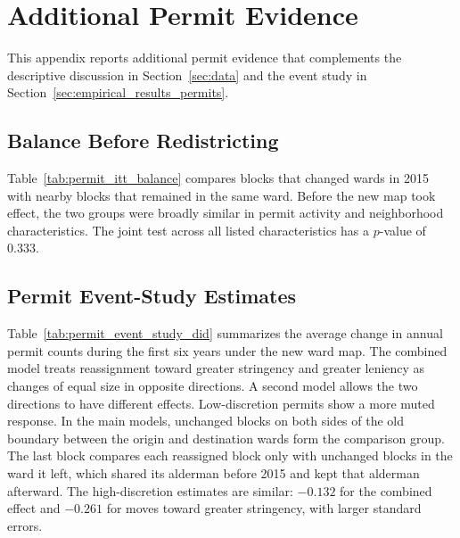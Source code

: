 
\section{Additional Permit Evidence}
\label{sec:appendix_permits}

This appendix reports additional permit evidence that complements the descriptive discussion in Section~\ref{sec:data} and the event study in Section~\ref{sec:empirical_results_permits}.

\subsection{Balance Before Redistricting}
\label{subsec:permit_balance}

Table~\ref{tab:permit_itt_balance} compares blocks that changed wards in 2015 with nearby blocks that remained in the same ward.
Before the new map took effect, the two groups were broadly similar in permit activity and neighborhood characteristics.
The joint test across all listed characteristics has a $p$-value of 0.333.



\subsection{Permit Event-Study Estimates}
\label{subsec:permit_event_study_estimates}

Table~\ref{tab:permit_event_study_did} summarizes the average change in annual permit counts during the first six years under the new ward map.
The combined model treats reassignment toward greater stringency and greater leniency as changes of equal size in opposite directions.
A second model allows the two directions to have different effects.
Low-discretion permits show a more muted response.
In the main models, unchanged blocks on both sides of the old boundary between the origin and destination wards form the comparison group.
The last block compares each reassigned block only with unchanged blocks in the ward it left, which shared its alderman before 2015 and kept that alderman afterward.
The high-discretion estimates are similar: $-0.132$ for the combined effect and $-0.261$ for moves toward greater stringency, with larger standard errors.

